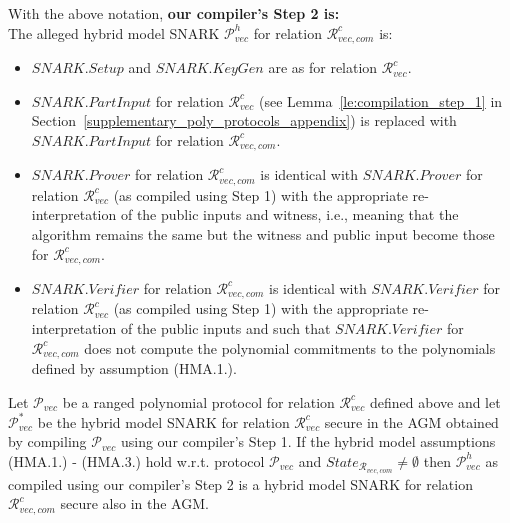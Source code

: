 \noindent With the above notation, \textbf{our compiler's Step 2 is:} \\
\noindent The alleged hybrid model SNARK $\mathscr{P}_{\mathit{vec}}^{h}$ for relation $\mathcal{R}_{\mathit{vec}, \mathit{com}}^c$ is:
\begin{itemize}
\item $\mathit{SNARK.Setup}$ and $\mathit{SNARK.KeyGen}$ are as for relation $\mathcal{R}^{c}_{\mathit{vec}}$.
\item $\mathit{SNARK.PartInput}$ for relation $\mathcal{R}^{c}_{\mathit{vec}}$ 
(see Lemma~\ref{le:compilation_step_1} in Section~\ref{supplementary_poly_protocols_appendix}) 
is replaced with $\mathit{SNARK.PartInput}$ for relation $\mathcal{R}_{\mathit{vec}, \mathit{com}}^c$.
\item $\mathit{SNARK.Prover}$ for relation $\mathcal{R}_{\mathit{vec}, \mathit{com}}^c$ is identical with 
$\mathit{SNARK.Prover}$ for relation $\mathcal{R}^{c}_{\mathit{vec}}$ (as compiled using Step 1) with the appropriate 
re-interpretation of the public inputs and witness, i.e., meaning that the algorithm remains the same but the witness and public input become those 
for $\mathcal{R}_{\mathit{vec}, \mathit{com}}^c$.
\item $\mathit{SNARK.Verifier}$ for relation $\mathcal{R}_{\mathit{vec}, \mathit{com}}^c$ is identical with 
$\mathit{SNARK.Verifier}$ for relation $\mathcal{R}^{c}_{\mathit{vec}}$ (as compiled using Step 1) with the appropriate 
re-interpretation of the public inputs and such that $\mathit{SNARK.Verifier}$ for $\mathcal{R}_{\mathit{vec}, \mathit{com}}^c$ does
not compute the polynomial commitments to the polynomials defined by assumption (HMA.1.).
\end{itemize}
\noindent \begin{lemma} 
\label{sergey_type_relations} 
Let $\mathscr{P}_{\mathit{vec}}$ be a ranged polynomial protocol for relation $\mathcal{R}^c_{\mathit{vec}}$ defined above and let 
$\mathscr{P}_{\mathit{vec}}^{*}$ be the hybrid model SNARK for relation $\mathcal{R}^c_{\mathit{vec}}$ secure in the AGM obtained 
by compiling $\mathscr{P}_{\mathit{vec}}$ using our compiler's Step 1. If the hybrid model assumptions (HMA.1.) - (HMA.3.) hold w.r.t. 
protocol $\mathscr{P}_{\mathit{vec}}$ and $\mathit{State}_{\mathcal{R}_{\mathit{vec}, \mathit{com}}} \neq \emptyset $ then 
$\mathscr{P}_{\mathit{vec}}^{h}$ as compiled using our compiler's Step 2 is a hybrid model SNARK for relation 
$\mathcal{R}_{\mathit{vec}, \mathit{com}}^c$ secure also in the AGM.
\end{lemma}

